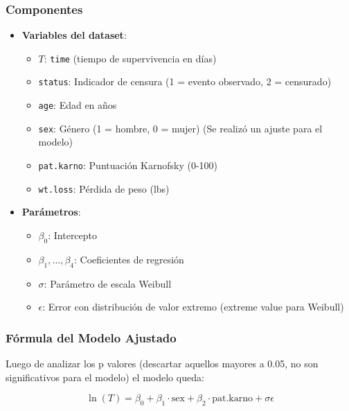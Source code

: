 \documentclass[a4paper,12pt]{article}
\begin{document}
\subsubsection*{Componentes}
\begin{itemize}
    \item \textbf{Variables del dataset}:
    \begin{itemize}
        \item $T$: \texttt{time} (tiempo de supervivencia en días)
        \item \texttt{status}: Indicador de censura (1 = evento observado, 2 = censurado)
        \item \texttt{age}: Edad en años
        \item \texttt{sex}: Género (1 = hombre, 0 = mujer) (Se realizó un ajuste para el modelo)
        \item \texttt{pat.karno}: Puntuación Karnofsky (0-100)
        \item \texttt{wt.loss}: Pérdida de peso (lbs)
    \end{itemize}
    
    \item \textbf{Parámetros}:
    \begin{itemize}
        \item $\beta_0$: Intercepto
        \item $\beta_1, \dots, \beta_4$: Coeficientes de regresión
        \item $\sigma$: Parámetro de escala Weibull
        \item $\epsilon$: Error con distribución de valor extremo (extreme value para Weibull)
    \end{itemize}
\end{itemize}

\subsubsection*{Fórmula del Modelo Ajustado}

Luego de analizar los p valores (descartar aquellos mayores a 0.05, no son significativos para el modelo) el modelo queda:

\begin{equation}
    \ln(T) = \beta_0 + \beta_1 \cdot \text{sex} +  \beta_2 \cdot \text{pat.karno}  + \sigma \epsilon
\end{equation}
\end{document}
